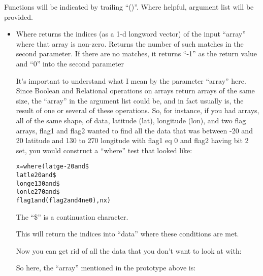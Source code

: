   Functions will be indicated by trailing ``()''. Where helpful,
  argument list will be provided.

  \begin{itemize}
    \item {}\label{sec:qs-where}
    
    Where returns the indices (as a 1-d longword vector) of the input
    ``array'' where that array is non-zero. Returns the number of such
    matches in the second parameter. If there are no matches, it
    returns ``-1'' as the return value and ``0'' into the second
    parameter

    It's important to understand what I mean by the parameter
    ``array'' here. Since Boolean and Relational operations on arrays
    return arrays of the same size, the ``array'' in the argument list
    could be, and in fact usually is, the result of one or several of
    these operations. So, for instance, if you had arrays, all of the
    same shape, of data, latitude (lat), longitude (lon), and two flag
    arrays, flag1 and flag2 wanted to find all the data that was
    between -20 and 20 latitude and 130 to 270 longitude with flag1 eq
    0 and flag2 having bit 2 set, you would construct a ``where'' test
    that looked like:

\begin{alltt}
x=where( lat ge -20 and \$
         lat le 20 and \$
         lon ge 130 and \$
         lon le 270 and \$
         flag1 and (flag2 and 4 ne 0), nx )
\end{alltt}

     The ``\$'' is a continuation character.

     This will return the indices into ``data'' where these conditions
    are met.

     Now you can get rid of all the data that you don't want to look
    at with:

      

    So here, the ``array'' mentioned in the prototype above is:




\end{itemize}
